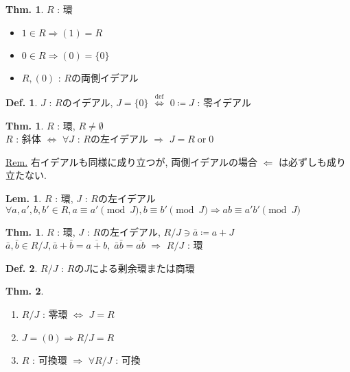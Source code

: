\documentclass[uplatex,dvipdfmx,9pt]{beamer}
\newcommand{\defarrow}{\overset{\mathrm{def}}{\Leftrightarrow}}
\newcounter{textThmCount}
\newcounter{textLemCount}
\theoremstyle{definition} %
\newtheorem{defn}{Def.}[subsection] %
\newtheorem{thm}{Thm.}[subsection] %
\newtheorem{thmText}[textThmCount]{Thm.}
\newtheorem{lemText}[textLemCount]{Lem.} %
\theoremstyle{example}
\begin{document}
    \begin{frame}

       \begin{thm}
        $R$ : 環
        \begin{itemize}
          \item $1 \in R \Rightarrow (1) = R$
          \item $0 \in R \Rightarrow (0) = \{0\}$
          \item $R, (0)$ : $R$の両側イデアル
        \end{itemize}
      \end{thm}

      \begin{defn}
        $J$ : $R$のイデアル, $J = \{0\}$ $\defarrow$ $0 \coloneqq J$ : \alert{零イデアル}
      \end{defn}

      \begin{thmText}
        $R$ : 環, $R \neq \emptyset$ \\
        $R$ : 斜体 $\Leftrightarrow$ $\forall J$ : $R$の左イデアル $\Rightarrow$ $J = R \; \text{or} \; 0$
      \end{thmText}
      \underline{Rem.} 右イデアルも同様に成り立つが, 両側イデアルの場合 $\Leftarrow$ は必ずしも成り立たない.

    \end{frame}

    \begin{frame}

      \begin{lemText}
        $R$ : 環, $J$ : $R$の左イデアル \\
        $\forall a, a', b, b' \in R, a \equiv a' \pmod{J}, b \equiv b' \pmod{J} \Rightarrow ab \equiv a'b' \pmod{J}$
      \end{lemText}

      \begin{thmText}
        $R$ : 環, $J$ : $R$の左イデアル, $R/J \ni \bar{a} \coloneqq a + J$ \\
        $\bar{a}, \bar{b} \in R/J, \bar{a} + \bar{b} = \overline{a + b}, \; \bar{a}\bar{b} = \overline{ab}$ $\Rightarrow$ $R/J$ : 環
      \end{thmText}

      \begin{defn}
        $R/J$ : $R$の$J$による\alert{剰余環}または\alert{商環}
      \end{defn}

      \begin{thm}
        \begin{enumerate}
          \item $R/J$ : 零環 $\Leftrightarrow$ $J = R$
          \item $J = (0) \Rightarrow R/J = R$
          \item $R$ : 可換環 $\Rightarrow$ $\forall R/J$ : 可換
        \end{enumerate}
      \end{thm}

    \end{frame}
\end{document}
